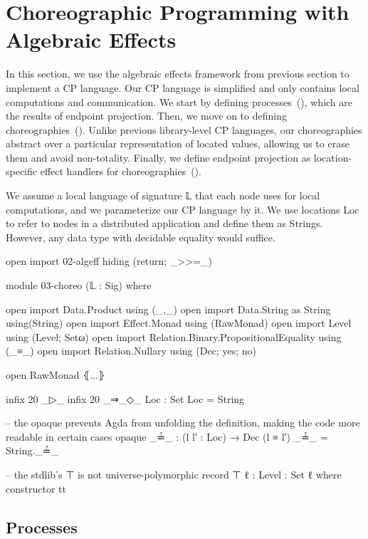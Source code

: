 \section{Choreographic Programming with Algebraic Effects}

In this section, we use the algebraic effects framework from previous section to implement a CP language.
%
Our CP language is simplified and only contains local computations and communication.
%
We start by defining processes~(), which are the results of endpoint projection.
%
Then, we move on to defining choreographies~().
%
Unlike previous library-level CP languages, our choreographies abstract over a particular representation of located values, allowing us to erase them and avoid non-totality.
%
Finally, we define endpoint projection as location-specific effect handlers for choreographies~().

We assume a local language of signature 𝕃 that each node uses for local computations, and we parameterize our CP language by it.
%
We use locations Loc to refer to nodes in a distributed application and define them as Strings.
%
However, any data type with decidable equality would suffice.

\begin{code}[hide]
open import 02-algeff hiding (return; _>>=_)

module 03-choreo (𝕃 : Sig) where

open import Data.Product using (_,_)
open import Data.String as String using(String)
open import Effect.Monad using (RawMonad)
open import Level using (Level; Setω)
open import Relation.Binary.PropositionalEquality using (_≡_)
open import Relation.Nullary using (Dec; yes; no)

open RawMonad ⦃...⦄

infix 20 _▷_
infix 20 _⇒_◇_
Loc : Set
Loc = String

-- the opaque prevents Agda from unfolding the definition, making the code more readable in certain cases
opaque
  _≟_ : (l l′ : Loc) → Dec (l ≡ l′)
  _≟_ = String._≟_

-- the stdlib's ⊤ is not universe-polymorphic
record ⊤ {ℓ : Level} : Set ℓ where
  constructor tt
\end{code}

\subsection{Processes}
\label{sec:process}

